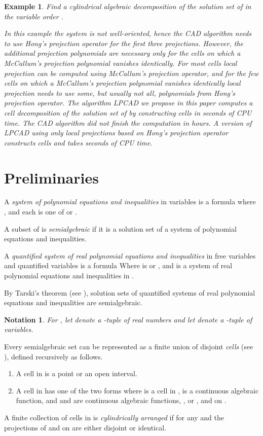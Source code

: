 \documentclass[english]{amsart}
\numberwithin{equation}{section}
\numberwithin{figure}{section}
\newtheorem{example}[thm]{Example}
\newtheorem{notation}[thm]{Notation}
\begin{document}
\begin{example}
Find a cylindrical algebraic decomposition of the solution set of
 in the variable order .

In this example the system is not well-oriented, hence the CAD algorithm
needs to use Hong's projection operator for the first three projections.
However, the additional projection polynomials are necessary only
for the cells on which a McCallum's projection polynomial vanishes
identically. For most cells local projection can be computed using
McCallum's projection operator, and for the few cells on which a McCallum's
projection polynomial vanishes identically local projection needs
to use some, but usually not all, polynomials from Hong's projection
operator. The algorithm LPCAD we propose in this paper computes a
cell decomposition of the solution set of  by constructing 
cells in  seconds of CPU time. The CAD algorithm did not finish
the computation in  hours. A version of LPCAD using only local
projections based on Hong's projection operator constructs 
cells and takes  seconds of CPU time. 
\end{example}

\section{Preliminaries}

A \emph{system of polynomial equations and inequalities} in variables
 is a formula
where , and each 
is one of  or . 

A subset of  is \emph{semialgebraic} if it is a solution
set of a system of polynomial equations and inequalities. 

A \emph{quantified system of real polynomial equations and inequalities}
in free variables  and quantified variables 
is a formula 
 Where  is  or , and  is a system
of real polynomial equations and inequalities in .

By Tarski's theorem (see \cite{T}), solution sets of quantified systems
of real polynomial equations and inequalities are semialgebraic.
\begin{notation}
For , let  denote a -tuple 
of real numbers and let  denote a -tuple 
of variables.
\end{notation}
Every semialgebraic set can be represented as a finite union of disjoint
\emph{cells} (see \cite{L}), defined recursively as follows.
\begin{enumerate}
\item A cell in  is a point or an open interval.
\item A cell in  has one of the two forms
where  is a cell in ,  is a continuous
algebraic function, and  and  are continuous algebraic
functions, , or , and  on . 
\end{enumerate}
A finite collection  of cells in  is \emph{cylindrically
arranged} if for any  and  the projections
of  and  on  are either disjoint
or identical. 
\end{document}
